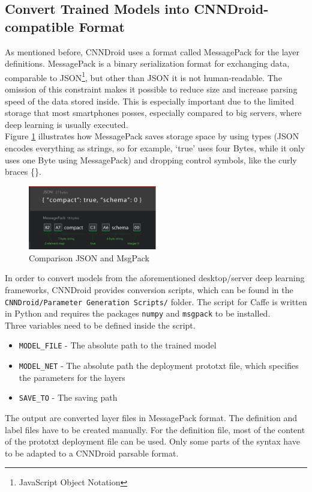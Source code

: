\subsection{Convert Trained Models into CNNDroid-compatible Format}
As mentioned before, CNNDroid uses a format called MessagePack for the layer definitions. MessagePack is a binary serialization format for exchanging data, comparable to JSON\footnote{JavaScript Object Notation}, but other than JSON it is not human-readable. The omission of this constraint makes it possible to reduce size and increase parsing speed of the data stored inside. This is especially important due to the limited storage that most smartphones posses, especially compared to big servers, where deep learning is usually executed.\\
Figure \ref{fig:json_vs_msgpack} illustrates how MessagePack saves storage space by using types (JSON encodes everything as strings, so for example, `true' uses four Bytes, while it only uses one Byte using MessagePack) and dropping control symbols, like the curly braces \{\}.

\begin{figure}[H]
  \centering
    \includegraphics[width=0.5\textwidth]{json_vs_msgpack.png}
  \caption{Comparison JSON and MsgPack}
  \label{fig:json_vs_msgpack}
\end{figure}

In order to convert models from the aforementioned desktop/server deep learning frameworks, CNNDroid provides conversion scripts, which can be found in the\\
\texttt{CNNDroid/Parameter Generation Scripts/} folder. The script for Caffe is written in Python and requires the packages \lstinline[language=python]{numpy} and \lstinline[language=python]{msgpack} to be installed.\\
Three variables need to be defined inside the script.
\begin{itemize}
  \item{\texttt{MODEL\_FILE} - The absolute path to the trained model}
  \item{\texttt{MODEL\_NET} - The absolute path the deployment prototxt file, which specifies the parameters for the layers}
  \item{\texttt{SAVE\_TO} - The saving path}
\end{itemize}
The output are converted layer files in MessagePack format. The definition and label files have to be created manually. For the definition file, most of the content of the prototxt deployment file can be used. Only some parts of the syntax have to be adapted to a CNNDroid parsable format.\\
\newpage
